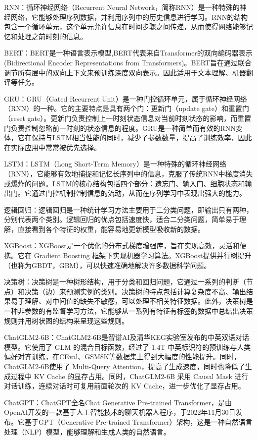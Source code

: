 RNN：循环神经网络（Recurrent Neural Network，简称RNN）是一种特殊的神经网络，它能够处理序列数据，并利用序列中的历史信息进行学习。RNN的结构包含一个循环单元，这个单元允许信息在时间步骤之间传递，从而使得网络能够记忆和处理之前时刻的信息。

BERT：BERT是一种语言表示模型,BERT代表来自Transformer的双向编码器表示(Bidirectional Encoder Representations from Transformers)。BERT旨在通过联合调节所有层中的双向上下文来预训练深度双向表示。因此适用于文本理解、机器翻译等任务。

GRU：GRU（Gated Recurrent Unit）是一种门控循环单元，属于循环神经网络（RNN）的一种。它的主要特点是具有两个门：更新门（update gate）和重置门（reset gate）。更新门负责控制上一时刻状态信息对当前时刻状态的影响，而重置门负责控制忽略前一时刻的状态信息的程度。GRU是一种简单而有效的RNN变体，它在保持与LSTM相当性能的同时，减少了参数数量，提高了训练效率，因此在实际应用中常常被优先选择。

LSTM：LSTM（Long Short-Term Memory）是一种特殊的循环神经网络（RNN），它能够有效地捕捉和记忆长序列中的信息，克服了传统RNN中梯度消失或爆炸的问题。LSTM的核心结构包括四个部分：遗忘门、输入门、细胞状态和输出门。它通过门控机制控制信息的流动，从而在序列学习中表现出强大的能力。

逻辑回归：逻辑回归是一种统计学习方法主要用于二分类问题，即输出只有两种，分别代表两个类别。逻辑回归的优点包括速度快，适合二分类问题，简单易于理解，直接看到各个特征的权重，能容易地更新模型吸收新的数据。

XGBoost：XGBoost是一个优化的分布式梯度增强库，旨在实现高效，灵活和便携。它在 Gradient Boosting 框架下实现机器学习算法。XGBoost提供并行树提升（也称为GBDT，GBM），可以快速准确地解决许多数据科学问题。

决策树：决策树是一种树形结构，用于分类和回归问题，它通过一系列的判断（节点）和决策（边）来预测实例的类别。决策树的特点包括计算复杂度不高、输出结果易于理解、对中间值的缺失不敏感，可以处理不相关特征数据。此外，决策树是一种非参数的有监督学习方法，它能够从一系列有特征有标签的数据中总结出决策规则并用树状图的结构来呈现这些规则。

ChatGLM2-6B：ChatGLM2-6B是智谱AI及清华KEG实验室发布的中英双语对话模型。它使用了 GLM 的混合目标函数，经过了 1.4T 中英标识符的预训练与人类偏好对齐训练，在CEval、GSM8K等数据集上得到大幅度的性能提升。同时，ChatGLM2-6B使用了 Multi-Query Attention，提高了生成速度，同时也降低了生成过程中 KV Cache 的显存占用。同时，ChatGLM2-6B 采用 Causal Mask 进行对话训练，连续对话时可复用前面轮次的 KV Cache，进一步优化了显存占用。

ChatGPT：ChatGPT全名Chat Generative Pre-trained Transformer，是由OpenAI开发的一款基于人工智能技术的聊天机器人程序，于2022年11月30日发布。它基于GPT（Generative Pre-trained Transformer）架构，这是一种自然语言处理（NLP）模型，能够理解和生成人类的自然语言。

